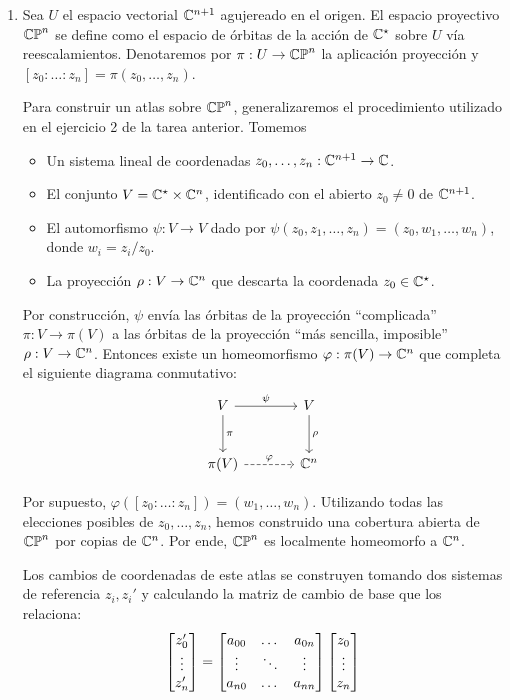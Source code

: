 \begin{solution}
\leavevmode
\begin{enumerate}[label=\alph*)]
    \item Sea $U$ el espacio vectorial $\mathbb C^{n+1}$ agujereado en el origen. El espacio proyectivo $\mathbb {CP}^n$ se define como el espacio de órbitas de la acción de $\mathbb C^\star$ sobre $U$ vía reescalamientos. Denotaremos por $\pi : U \to \mathbb {CP}^n$ la aplicación proyección y $[z_0 : \dots : z_n] = \pi(z_0, \dots, z_n)$.
    
    Para construir un atlas sobre $\mathbb {CP}^n$, generalizaremos el procedimiento utilizado en el ejercicio 2 de la tarea anterior. Tomemos
    \begin{itemize}
        \item Un sistema lineal de coordenadas $z_0, \dots, z_n : \mathbb C^{n+1} \to \mathbb C$.
        \item El conjunto $V = \mathbb C^\star \times \mathbb C^n$, identificado con el abierto $z_0 \ne 0$ de $\mathbb C^{n+1}$.
        \item El automorfismo $\psi : V \to V$ dado por $\psi(z_0, z_1, \dots, z_n) = (z_0, w_1, \dots, w_n)$, donde $w_i = z_i / z_0$.
        \item La proyección $\rho : V \to \mathbb C^n$ que descarta la coordenada $z_0 \in \mathbb C^\star$.
    \end{itemize}
    
    Por construcción, $\psi$ envía las órbitas de la proyección ``complicada'' $\pi : V \to \pi(V)$ a las órbitas de la proyección ``más sencilla, imposible'' $\rho : V \to \mathbb C^n$. Entonces existe un homeomorfismo $\varphi : \pi(V) \to \mathbb C^n$ que completa el siguiente diagrama conmutativo:
    $$
    \begin{tikzcd}[row sep=large, column sep=large]
        V \arrow[r, "\psi"] \arrow[d, "\pi"] & V \arrow[d, "\rho"] \\
        \pi(V) \arrow[r, dashed, "\varphi"] & \C^n
    \end{tikzcd}
    $$
    
    Por supuesto, $\varphi([z_0 : \dots : z_n]) = (w_1, \dots, w_n)$. Utilizando todas las elecciones posibles de $z_0, \dots, z_n$, hemos construido una cobertura abierta de $\mathbb {CP}^n$ por copias de $\mathbb C^n$. Por ende, $\mathbb {CP}^n$ es localmente homeomorfo a $\mathbb C^n$.
    
    Los cambios de coordenadas de este atlas se construyen tomando dos sistemas de referencia $z_i, z_i'$ y calculando la matriz de cambio de base que los relaciona:
    $$
    \begin{bmatrix} z_0' \\ \vdots \\ z_n' \end{bmatrix} =
    \begin{bmatrix} 
        a_{00} & \dots & a_{0n} \\
        \vdots & \ddots & \vdots \\
        a_{n0} & \dots & a_{nn} \end{bmatrix}
    \begin{bmatrix} z_0 \\ \vdots \\ z_n \end{bmatrix}
    $$
    

\end{enumerate}
\end{solution}
